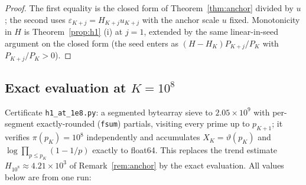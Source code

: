 \documentclass[11pt]{article}
\theoremstyle{remark}
\newcommand{\eps}{\varepsilon}
\begin{document}
\begin{proof}
The first equality is the closed form of Theorem~\ref{thm:anchor} divided by
$u$; the second uses $\eps_{K+j}=H_{K+j}u_{K+j}$ with the anchor scale $u$
fixed. Monotonicity in $H$ is Theorem~\ref{prop:h1} (i) at $j=1$, extended by
the same linear-in-seed argument on the closed form (the seed enters as
$(H-H_K)P_{K+j}/P_K$ with $P_{K+j}/P_K>0$).
\end{proof}

\subsection{Exact evaluation at $K=10^8$}\label{subsec:h1num}

Certificate \texttt{h1\_at\_1e8.py}: a segmented bytearray sieve to
$2.05\times10^9$ with per-segment exactly-rounded (\texttt{fsum}) partials,
visiting every prime up to $p_{K+1}$; it verifies $\pi(p_K)=10^8$
independently and accumulates $X_K=\vartheta(p_K)$ and
$\log\prod_{p\le p_K}(1-1/p)$ exactly to float64. This replaces the trend
estimate $H_{10^8}\approx4.21\times10^{3}$ of Remark~\ref{rem:anchor} by the
exact evaluation. All values below are from one run:
\end{document}
